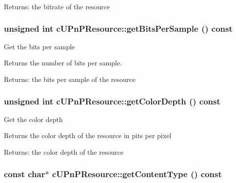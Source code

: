 \begin{Desc}
\item[Returns:]the bitrate of the resource \end{Desc}
\hypertarget{classcUPnPResource_3efd82888fd648dd08b5d43520638d17}{
\subsubsection[{getBitsPerSample}]{\setlength{\rightskip}{0pt plus 5cm}unsigned int cUPnPResource::getBitsPerSample () const}}
\label{classcUPnPResource_3efd82888fd648dd08b5d43520638d17}


Get the bits per sample

Returns the number of bits per sample.

\begin{Desc}
\item[Returns:]the bits per sample of the resource \end{Desc}
\hypertarget{classcUPnPResource_276eddcc28bad31d6178cf109373074a}{
\subsubsection[{getColorDepth}]{\setlength{\rightskip}{0pt plus 5cm}unsigned int cUPnPResource::getColorDepth () const}}
\label{classcUPnPResource_276eddcc28bad31d6178cf109373074a}


Get the color depth

Returns the color depth of the resource in pits per pixel

\begin{Desc}
\item[Returns:]the color depth of the resource \end{Desc}
\hypertarget{classcUPnPResource_6aeaaf476c5d6548b15bb381c032b815}{
\subsubsection[{getContentType}]{\setlength{\rightskip}{0pt plus 5cm}const char$\ast$ cUPnPResource::getContentType () const}}
\label{classcUPnPResource_6aeaaf476c5d6548b15bb381c032b815}


